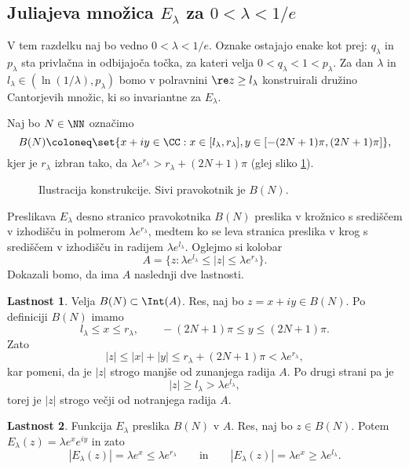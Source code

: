 \subsection{Juliajeva množica \texorpdfstring{\(E_\lambda\)}{E\_\lambda} za \texorpdfstring{\(0 < \lambda < 1/e\)}{0 < \lambda < 1/e}}

V tem razdelku naj bo vedno \(0 < \lambda < 1/e\). Oznake ostajajo enake kot prej: \(q_\lambda\) in \(p_\lambda\) sta privlačna in odbijajoča točka, za kateri velja \(0 < q_\lambda < 1 < p_\lambda\). Za dan \(\lambda\) in \(l_\lambda \in (\ln (1 / \lambda), p_\lambda)\) bomo v polravnini \(\re z \geq l_\lambda\) konstruirali družino Cantorjevih množic, ki so invariantne za \(E_\lambda\).

Naj bo \(N \in \NN\) označimo
\[B(N) \coloneq \set{x + iy \in \CC : x \in [l_\lambda, r_\lambda], y \in [- (2N + 1) \pi, (2N + 1) \pi]},\]
kjer je \(r_\lambda\) izbran tako, da \(\lambda e^{r_\lambda} > r_\lambda + (2N + 1) \pi\) (glej sliko \ref{fig:konstrukcija}).
\begin{figure}%
    \centering
    
    \caption{Ilustracija konstrukcije. Sivi pravokotnik je \(B (N)\).}
    \label{fig:konstrukcija}
\end{figure}
Preslikava \(E_\lambda\) desno stranico pravokotnika \(B (N)\) preslika v krožnico s središčem v izhodišču in polmerom \(\lambda e^{r_\lambda}\), medtem ko se leva stranica preslika v krog s središčem v izhodišču in radijem \(\lambda e^{l_\lambda}\). Oglejmo si kolobar
\[A = \{z : \lambda e^{l_\lambda} \leq |z| \leq \lambda e^{r_\lambda}\}.\]
Dokazali bomo, da ima \(A\) naslednji dve lastnosti.

\vspace{5mm}
\noindent \textbf{Lastnost 1}. Velja \(B (N) \subset \Int (A)\). Res, naj  bo \(z = x + i y \in B (N)\). Po definiciji \(B (N)\) imamo
\[l_\lambda \leq x \leq r_\lambda, \qquad - (2N + 1) \pi \leq y \leq (2N + 1) \pi.\]
Zato
\[|z| \leq |x| + |y| \leq r_\lambda + (2N + 1) \pi < \lambda e^{r_\lambda},\]
kar pomeni, da je \(|z|\) strogo manjše od zunanjega radija \(A\). Po drugi strani pa je
\[|z| \geq l_\lambda > \lambda e^{l_\lambda},\]
torej je \(|z|\) strogo večji od notranjega radija \(A\).

\noindent \textbf{Lastnost 2}. Funkcija \(E_\lambda\) preslika \(B (N)\) v \(A\). Res, naj bo \(z \in B (N)\). Potem \(E_\lambda (z) = \lambda e^x e^{i y}\) in zato
\[|E_\lambda (z)| = \lambda e^x \leq \lambda e^{r_\lambda} \qquad \text{in} \qquad |E_\lambda (z)| = \lambda e^x \geq \lambda e^{l_\lambda}.\]
\vspace{5mm}

